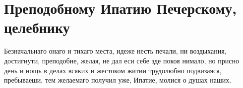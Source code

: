\section{Преподобному Ипатию Печерскому, целебнику}\begin{mymulticols}



Безначальнаго онаго и тихаго места, идеже несть печали, ни воздыхания, достигнути, преподобне, желая, не дал еси себе зде покоя нимало, но присно день и нощь в делах всяких и жестоком житии трудолюбно подвизаяся, пребываеши, тем желаемаго получил уже, Ипатие, молися о душах наших.


\end{mymulticols}

\mychapterending





